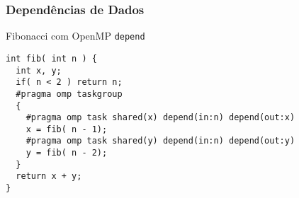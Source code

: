 \begin{frame}[fragile]
  \frametitle{Dependências de Dados}
Fibonacci com OpenMP \texttt{depend}
\begin{minipage}{0.95\textwidth}  
\begin{verbatim}  
int fib( int n ) {
  int x, y;
  if( n < 2 ) return n;
  #pragma omp taskgroup
  {
    #pragma omp task shared(x) depend(in:n) depend(out:x)
    x = fib( n - 1);
    #pragma omp task shared(y) depend(in:n) depend(out:y)
    y = fib( n - 2);
  }
  return x + y;
}
\end{verbatim}
\end{minipage}
\end{frame}

